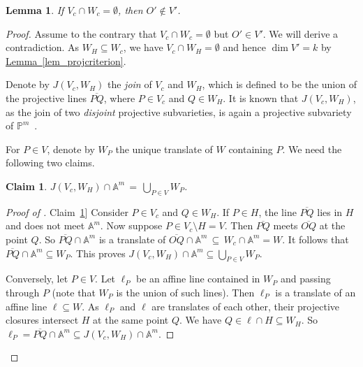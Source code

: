 \documentclass[11pt]{article}
\numberwithin{equation}{section}
\newtheorem{lemma}[theorem]{Lemma}
\newtheorem{claim}[theorem]{Claim}
\theoremstyle{definition}
\theoremstyle{plain}
\newcommand{\expref}[2]{\hyperref[#2]{#1~\ref{#2}}}
\newcommand{\aff}{\mathbb{A}}
\newcommand{\proj}{\mathbb{P}}
\begin{document}
\begin{lemma}\label{lem_projcriterion2}
If  $V_c\cap W_c=\emptyset$, then $O'\not\in V'$. 
\end{lemma}
\begin{proof}

 Assume to the contrary that   $V_c\cap W_c=\emptyset$ but $O'\in V'$. We will derive a contradiction. 
As $W_H\subseteq W_c$, we have  $V_c\cap W_H=\emptyset$ and hence $\dim V'=k$ by \expref{Lemma}{lem_projcriterion}.

Denote by $J(V_c, W_H)$ the \emph{join} of $V_c$ and $W_H$, which is defined to be the union of the projective lines $\overline{PQ}$, where $P\in V_c$ and $Q\in W_H$. It is known that $J(V_c, W_H)$, as the join of two \emph{disjoint} projective subvarieties, is again a projective subvariety of $\proj^m$~\cite[Example~6.17]{Har92}. 

For $P\in V$,  denote by $W_P$ the unique translate of $W$ containing $P$. We need the following two 
%
claims. %

\begin{claim}\label{claim_join}
$J(V_c, W_H)\cap \aff^m \,=\, \bigcup_{P\in V} W_P$.
\end{claim}
\begin{proof}[Proof of \expref{Claim}{claim_join}]
Consider $P\in V_c$ and $Q\in W_H$. If $P\in H$, the line $\overline{PQ}$ lies in $H$ and does not meet $\aff^m$. Now suppose $P\in V_c\setminus H=V$. Then $\overline{PQ}$ meets $\overline{OQ}$ at the point $Q$. So $\overline{PQ}\cap \aff^m$ is a translate of $\overline{OQ}\cap \aff^m \,\subseteq\, W_c\cap\aff^m = W$. It follows that $\overline{PQ}\cap \aff^m\subseteq W_P$. This proves  $J(V_c, W_H)\cap \aff^m\subseteq \bigcup_{P\in V} W_P$.

Conversely, let $P\in V$.   Let $\ell_P$ be an affine line contained in $W_P$ and passing through $P$ (note that $W_P$ is the union of such lines). Then $\ell_P$ is a translate of an affine line $\ell\subseteq W$. As $\ell_P$ and $\ell$ are translates of each other, their projective closures intersect $H$ at the same point $Q$. We have $Q\in \ell\cap H \subseteq W_H$. So $\ell_P=\overline{PQ}\cap \aff^m\subseteq J(V_c, W_H)\cap \aff^m$.
\end{proof}

%
%
%
%


\end{proof}
\end{document}
